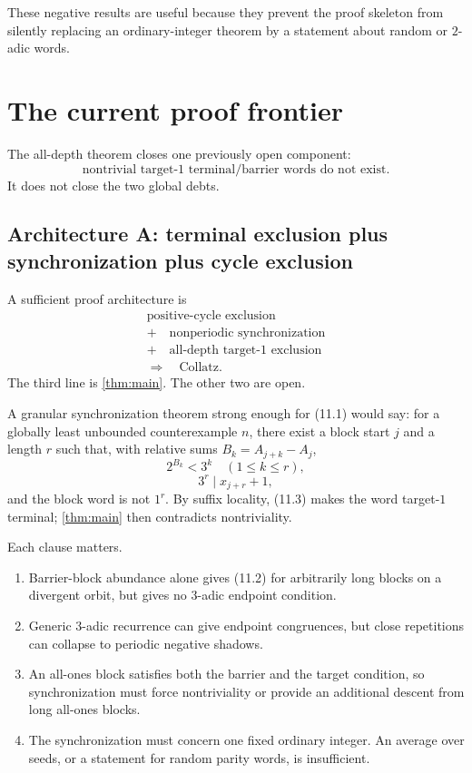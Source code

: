 \documentclass[11pt]{article}
\theoremstyle{definition}
\theoremstyle{remark}
\begin{document}
These negative results are useful because they prevent the proof skeleton from
silently replacing an ordinary-integer theorem by a statement about random or
$2$-adic words.

\section{The current proof frontier}\label{sec:frontier}

The all-depth theorem closes one previously open component:
\[
 \boxed{\text{nontrivial target-$1$ terminal/barrier words do not exist}.}
\]
It does not close the two global debts.

\subsection{Architecture A: terminal exclusion plus synchronization plus
cycle exclusion}

A sufficient proof architecture is
\[
 \begin{gathered}
 \text{positive-cycle exclusion}\\
 +\quad\text{nonperiodic synchronization}\\
 +\quad\text{all-depth target-$1$ exclusion}\\
 \Longrightarrow\quad\text{Collatz}.
 \end{gathered}                                        \tag{11.1}
\]
The third line is \cref{thm:main}.  The other two are open.

A granular synchronization theorem strong enough for \textup{(11.1)} would say:
for a globally least unbounded counterexample $n$, there exist a block start
$j$ and a length $r$ such that, with relative sums
$B_k=A_{j+k}-A_j$,
\[
 2^{B_k}<3^k\quad(1\le k\le r),                       \tag{11.2}
\]
\[
 3^r\mid x_{j+r}+1,                                   \tag{11.3}
\]
and the block word is not $1^r$.  By suffix locality, \textup{(11.3)} makes the
word target-$1$ terminal; \cref{thm:main} then contradicts nontriviality.

Each clause matters.
\begin{enumerate}[label=\textup{(\roman*)}]
\item Barrier-block abundance alone gives \textup{(11.2)} for arbitrarily long
blocks on a divergent orbit, but gives no $3$-adic endpoint condition.
\item Generic $3$-adic recurrence can give endpoint congruences, but close
repetitions can collapse to periodic negative shadows.
\item An all-ones block satisfies both the barrier and the target condition,
so synchronization must force nontriviality or provide an additional descent
from long all-ones blocks.
\item The synchronization must concern one fixed ordinary integer.  An
average over seeds, or a statement for random parity words, is insufficient.
\end{enumerate}
\end{document}
